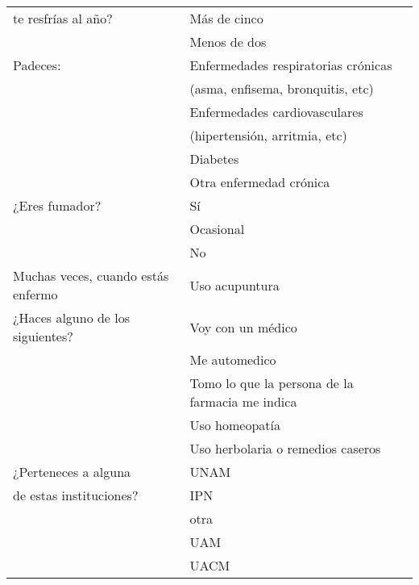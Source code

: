 \documentclass[letterpaper]{article}
\begin{document}
\begin{longtable}{|l|l|}
te resfrías al año? & Más de cinco \\ 
 & Menos de dos \\ \hline 
Padeces: & Enfermedades respiratorias crónicas \\ 
 &  (asma, enfisema, bronquitis, etc) \\
 & Enfermedades cardiovasculares  \\ 
 & (hipertensión, arritmia, etc) \\
 & Diabetes \\ 
 & Otra enfermedad crónica \\ \hline 
¿Eres fumador? & Sí \\ 
 & Ocasional \\ 
 & No \\ \hline
Muchas veces, cuando estás enfermo & Uso acupuntura \\ 
 ¿Haces alguno de los siguientes? & Voy con un médico \\ 
 & Me automedico \\ 
 & Tomo lo que la persona de la farmacia me indica \\ 
 & Uso homeopatía \\ 
 & Uso herbolaria o remedios caseros \\ \hline 
¿Perteneces a alguna  & UNAM \\ 
de estas instituciones? & IPN \\ 
 & otra \\ 
 & UAM \\ 
 & UACM \\ \hline 
 \end{longtable}
\end{document}
